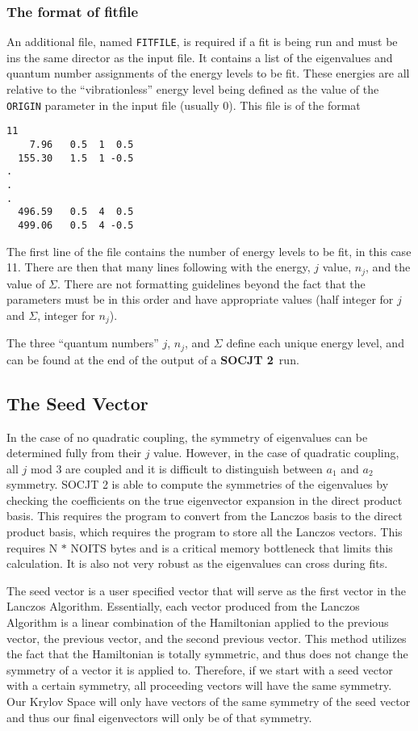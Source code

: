 \documentclass{article}
\newcommand{\socjttwo}{{\bf SOCJT 2}}
\begin{document}
\subsubsection{The format of fitfile} \label{section:fitting:file}

An additional file, named {\tt FITFILE}, is required if a fit is being run and must be ins the same director as the input file. It contains a list
of the eigenvalues and quantum number assignments of the energy levels to
be fit. These energies are all relative to the ``vibrationless''
energy level being defined as the value of the {\tt ORIGIN} parameter in the input file (usually 0). This file is of the format 
\begin{verbatim}
11
    7.96   0.5  1  0.5
  155.30   1.5  1 -0.5
.
.
.
  496.59   0.5  4  0.5
  499.06   0.5  4 -0.5  
\end{verbatim}
The first line of the file contains the number of energy levels to be
fit, in this case 11.  There are then that many lines following with
the energy, $j$ value, $n_j$, and the value of $\Sigma $.  There are not formatting guidelines beyond the fact that the parameters must be in this order and have appropriate values (half integer for $j$ and $\Sigma$, integer for $n_j$).

The three ``quantum numbers'' $j$,
$n_j$, and $\Sigma $ define each unique energy level, and can be found
at the end of the output of a \socjttwo\ run.

\subsection{The Seed Vector}

In the case of no quadratic coupling, the symmetry of eigenvalues can be determined fully from their $j$ value. However, in the case of quadratic coupling, all $j$ mod 3 are coupled and it is difficult to distinguish between $a_1$ and $a_2$ symmetry. SOCJT 2 is able to compute the symmetries of the eigenvalues by checking the coefficients on the true eigenvector expansion in the direct product basis. This requires the program to convert from the Lanczos basis to the direct product basis, which requires the program to store all the Lanczos vectors. This requires N $*$ NOITS bytes and is a critical memory bottleneck that limits this calculation. It is also not very robust as the eigenvalues can cross during fits.

The seed vector is a user specified vector that will serve as the first vector in the Lanczos Algorithm. Essentially, each vector produced from the Lanczos Algorithm is a linear combination of the Hamiltonian applied to the previous vector, the previous vector, and the second previous vector. This method utilizes the fact that the Hamiltonian is totally symmetric, and thus does not change the symmetry of a vector it is applied to. Therefore, if we start with a seed vector with a certain symmetry, all proceeding vectors will have the same symmetry. Our Krylov Space will only have vectors of the same symmetry of the seed vector and thus our final eigenvectors will only be of that symmetry.
\end{document}
